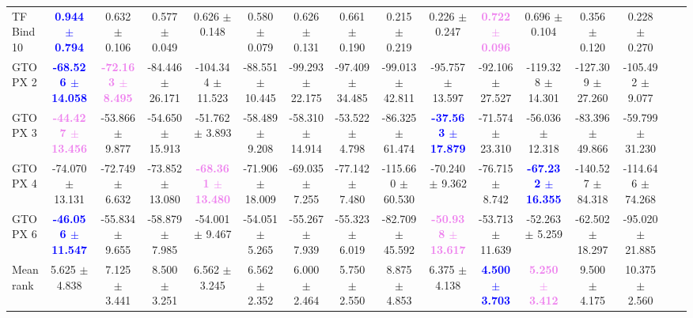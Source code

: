 \begin{table}[t!]
{\begin{tabular}{l|c|c|c|*{12}{c}}
TF Bind 10 & \textbf{\textcolor{blue}{0.944 $\pm$ 0.794}} & 0.632 $\pm$ 0.106 & 0.577 $\pm$ 0.049 & 0.626 $\pm$ 0.148 & 0.580 $\pm$ 0.079 & 0.626 $\pm$ 0.131 & 0.661 $\pm$ 0.190 & 0.215 $\pm$ 0.219 & 0.226 $\pm$ 0.247 & \textbf{\textcolor{violet}{0.722 $\pm$ 0.096}} & 0.696 $\pm$ 0.104 & 0.356 $\pm$ 0.120 & 0.228 $\pm$ 0.270 \\
GTOPX 2 & \textbf{\textcolor{blue}{-68.526 $\pm$ 14.058}} & \textbf{\textcolor{violet}{-72.163 $\pm$ 8.495}} & -84.446 $\pm$ 26.171 & -104.344 $\pm$ 11.523 & -88.551 $\pm$ 10.445 & -99.293 $\pm$ 22.175 & -97.409 $\pm$ 34.485 & -99.013 $\pm$ 42.811 & -95.757 $\pm$ 13.597 & -92.106 $\pm$ 27.527 & -119.328 $\pm$ 14.301 & -127.309 $\pm$ 27.260 & -105.492 $\pm$ 9.077 \\
GTOPX 3 & \textbf{\textcolor{violet}{-44.427 $\pm$ 13.456}} & -53.866 $\pm$ 9.877 & -54.650 $\pm$ 15.913 & -51.762 $\pm$ 3.893 & -58.489 $\pm$ 9.208 & -58.310 $\pm$ 14.914 & -53.522 $\pm$ 4.798 & -86.325 $\pm$ 61.474 & \textbf{\textcolor{blue}{-37.563 $\pm$ 17.879}} & -71.574 $\pm$ 23.310 & -56.036 $\pm$ 12.318 & -83.396 $\pm$ 49.866 & -59.799 $\pm$ 31.230 \\
GTOPX 4 & -74.070 $\pm$ 13.131 & -72.749 $\pm$ 6.632 & -73.852 $\pm$ 13.080 & \textbf{\textcolor{violet}{-68.361 $\pm$ 13.480}} & -71.906 $\pm$ 18.009 & -69.035 $\pm$ 7.255 & -77.142 $\pm$ 7.480 & -115.660 $\pm$ 60.530 & -70.240 $\pm$ 9.362 & -76.715 $\pm$ 8.742 & \textbf{\textcolor{blue}{-67.232 $\pm$ 16.355}} & -140.527 $\pm$ 84.318 & -114.646 $\pm$ 74.268 \\
GTOPX 6 & \textbf{\textcolor{blue}{-46.056 $\pm$ 11.547}} & -55.834 $\pm$ 9.655 & -58.879 $\pm$ 7.985 & -54.001 $\pm$ 9.467 & -54.051 $\pm$ 5.265 & -55.267 $\pm$ 7.939 & -55.323 $\pm$ 6.019 & -82.709 $\pm$ 45.592 & \textbf{\textcolor{violet}{-50.938 $\pm$ 13.617}} & -53.713 $\pm$ 11.639 & -52.263 $\pm$ 5.259 & -62.502 $\pm$ 18.297 & -95.020 $\pm$ 21.885 \\
\midrule
Mean rank & 5.625 $\pm$ 4.838 & 7.125 $\pm$ 3.441 & 8.500 $\pm$ 3.251 & 6.562 $\pm$ 3.245 & 6.562 $\pm$ 2.352 & 6.000 $\pm$ 2.464 & 5.750 $\pm$ 2.550 & 8.875 $\pm$ 4.853 & 6.375 $\pm$ 4.138 & \textbf{\textcolor{blue}{4.500 $\pm$ 3.703}} & \textbf{\textcolor{violet}{5.250 $\pm$ 3.412}} & 9.500 $\pm$ 4.175 & 10.375 $\pm$ 2.560 \\
\bottomrule
\end{tabular}
}
\label{tab:gtg-gtgdfgo-eval-m12}
\end{table}
